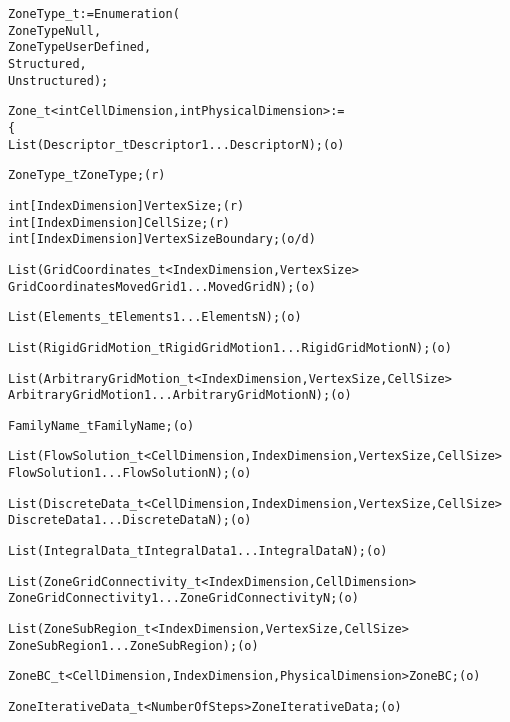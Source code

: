 \begin{alltt}	
  ZoneType\_t := Enumeration(
    ZoneTypeNull,
    ZoneTypeUserDefined,
    Structured,
    Unstructured ) ;

  Zone_t< int CellDimension, int PhysicalDimension > :=
    \{
    List( Descriptor_t Descriptor1 ... DescriptorN ) ;                      (o)

    ZoneType_t ZoneType ;                                                   (r)

    int[IndexDimension] VertexSize ;                                        (r)
    int[IndexDimension] CellSize ;                                          (r)
    int[IndexDimension] VertexSizeBoundary ;                                (o/d)

    List( GridCoordinates_t<IndexDimension, VertexSize>
          GridCoordinates MovedGrid1 ... MovedGridN ) ;                     (o)

    List( Elements_t Elements1 ... ElementsN ) ;                            (o)

    List( RigidGridMotion_t RigidGridMotion1 ... RigidGridMotionN ) ;       (o)

    List( ArbitraryGridMotion_t<IndexDimension, VertexSize, CellSize>
          ArbitraryGridMotion1 ... ArbitraryGridMotionN ) ;                 (o)

    FamilyName_t FamilyName ;                                               (o)

    List( FlowSolution_t<CellDimension, IndexDimension, VertexSize, CellSize> 
          FlowSolution1 ... FlowSolutionN ) ;                               (o)

    List( DiscreteData_t<CellDimension, IndexDimension, VertexSize, CellSize> 
          DiscreteData1 ... DiscreteDataN ) ;                               (o)

    List( IntegralData_t IntegralData1 ... IntegralDataN ) ;                (o)

    List( ZoneGridConnectivity_t<IndexDimension, CellDimension>
          ZoneGridConnectivity1 ... ZoneGridConnectivityN ;                 (o)

    List( ZoneSubRegion_t<IndexDimension, VertexSize, CellSize>
          ZoneSubRegion1 ... ZoneSubRegion ) ;                              (o)

    ZoneBC_t<CellDimension, IndexDimension, PhysicalDimension> ZoneBC ;     (o)

    ZoneIterativeData_t<NumberOfSteps> ZoneIterativeData ;                  (o)


\end{alltt}
